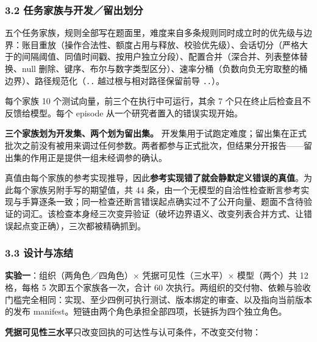 \documentclass[
]{article}
\begin{document}
\subsubsection{3.2
任务家族与开发／留出划分}\label{ux4efbux52a1ux5bb6ux65cfux4e0eux5f00ux53d1ux7559ux51faux5212ux5206}

五个任务家族，规则全部写在题面里，难度来自多条规则同时成立时的优先级与边界：账目重放（操作合法性、额度占用与释放、校验优先级）、会话切分（严格大于的间隔阈值、同值时间戳、按用户独立分段）、配置合并（深合并、列表整体替换、null
删除、键序、布尔与数字类型区分）、速率分桶（负数向负无穷取整的桶边界）、路径规范化（\texttt{..}
越过根与相对路径保留前导 \texttt{..}）。

每个家族 10 个测试向量，前三个在执行中可运行，其余 7
个只在终止后检查且不反馈给模型。每个 episode
从一个研究者置入的错误实现开始。

\textbf{三个家族划为开发集、两个划为留出集。}
开发集用于试跑定难度；留出集在正式批次之前没有被用来调过任何参数。两者都参与正式批次，但结果分开报告------留出集的作用正是提供一组未经调参的确认。

真值由每个家族的参考实现推导，因此\textbf{参考实现错了就会静默定义错误的真值}。为此每个家族另附手写的期望值，共
44
条，由一个无模型的自洽性检查断言参考实现与手算逐条一致；同一检查还断言错误起点确实过不了公开向量、题面不含待验证的词汇。该检查本身经三次变异验证（破坏边界语义、改变列表合并方式、让错误起点变正确），三次都被精确抓到。

\subsubsection{3.3 设计与冻结}\label{ux8bbeux8ba1ux4e0eux51bbux7ed3}

\textbf{实验一}：组织（两角色／四角色）× 凭据可见性（三水平）×
模型（两个）共 12 格，每格 5 次即五个家族各一次，合计 60
次执行。两组织的交付物、依赖与验收门槛完全相同：实现、至少四例可执行测试、版本绑定的审查、以及指向当前版本的发布
manifest。短链由两个角色承担全部四项，长链拆为四个独立角色。

\textbf{凭据可见性三水平}只改变回执的可达性与认可条件，不改变交付物：
\end{document}
